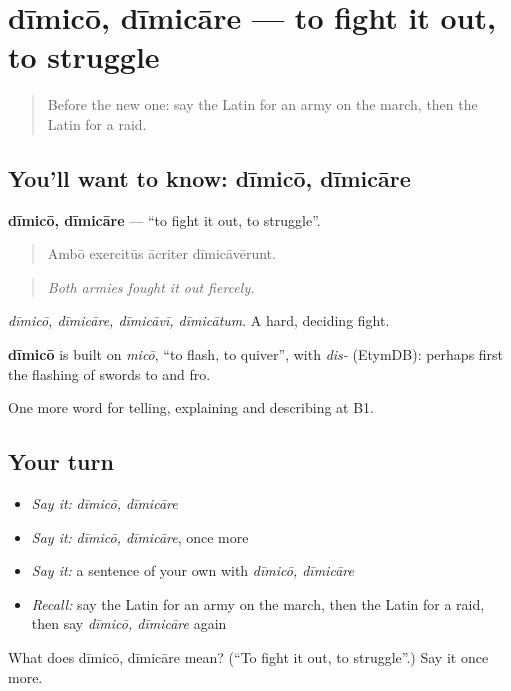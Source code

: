 \section[dīmicō, dīmicāre]{dīmicō, dīmicāre — to fight it out, to struggle}

\label{lesson:LA-C339-dimico}



\begin{quote}
Before the new one: say the Latin for an army on the march, then the Latin for a raid.
\end{quote}

\subsection*{You'll want to know: dīmicō, dīmicāre}
\textbf{dīmicō, dīmicāre} — \textquotedblleft{}to fight it out, to struggle\textquotedblright{}.

\begin{quote}
Ambō exercitūs ācriter dīmicāvērunt.
\end{quote}

\begin{quote}
\emph{Both armies fought it out fiercely.}
\end{quote}

\emph{dīmicō, dīmicāre, dīmicāvī, dīmicātum}. A hard, deciding fight.

\begin{cousinweb}
\textbf{dīmicō} is built on \emph{micō}, \textquotedblleft{}to flash, to quiver\textquotedblright{}, with \emph{dis-} (EtymDB): perhaps first the flashing of swords to and fro.
\end{cousinweb}

\begin{grammarlens}[title={What you've built}]
One more word for telling, explaining and describing at B1.
\end{grammarlens}

\subsection*{Your turn}
\begin{itemize}
\raggedright
  \item \emph{Say it:} \emph{dīmicō, dīmicāre}
  \item \emph{Say it:} \emph{dīmicō, dīmicāre}, once more
  \item \emph{Say it:} a sentence of your own with \emph{dīmicō, dīmicāre}
  \item \emph{Recall:} say the Latin for an army on the march, then the Latin for a raid, then say \emph{dīmicō, dīmicāre} again
\end{itemize}

\begin{tcolorbox}[breakable,colback=teal!4,colframe=teal!35!black,title={Before you move on}]
What does dīmicō, dīmicāre mean? (\textquotedblleft{}To fight it out, to struggle\textquotedblright{}.) Say it once more.
\end{tcolorbox}
